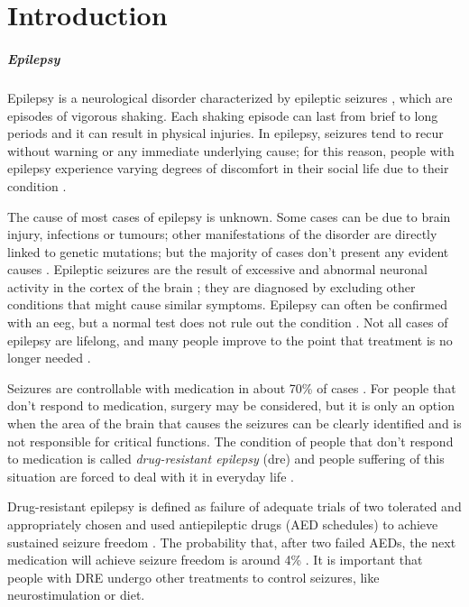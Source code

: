
\chapter{Introduction} \label{chap: introduction}

\paragraph{Epilepsy} Epilepsy is a neurological disorder characterized by epileptic seizures \cite{NEJM:epilepsy}\cite{Epilepsia:epilepsy}, which are episodes of vigorous shaking. Each shaking episode can last from brief to long periods and it can result in physical injuries. In epilepsy, seizures tend to recur without warning or any immediate underlying cause; for this reason, people with epilepsy experience varying degrees of discomfort in their social life due to their condition \cite{WHO:epilepsy}.

The cause of most cases of epilepsy is unknown. Some cases can be due to brain injury, infections or tumours; other manifestations of the disorder are directly linked to genetic mutations; but the majority of cases don't present any evident causes \cite{WHO:epilepsy}. Epileptic seizures are the result of excessive and abnormal neuronal activity in the cortex of the brain \cite{Epilepsia:epilepsy}; they are diagnosed by excluding other conditions that might cause similar symptoms. Epilepsy can often be confirmed with an \acf{eeg}, but a normal test does not rule out the condition \cite{Hpim:seizuresandepilepsy}. Not all cases of epilepsy are lifelong, and many people improve to the point that treatment is no longer needed \cite{WHO:epilepsy}.

Seizures are controllable with medication in about 70\% of cases \cite{ERN:treatmentofepilepsy}. For people that don't respond to medication, surgery may be considered, but it is only an option when the area of the brain that causes the seizures can be clearly identified and is not responsible for critical functions. The condition of people that don't respond to medication is called \textit{drug-resistant epilepsy} (\acs{dre}) and people suffering of this situation are forced to deal with it in everyday life \cite{Epilepsia:DRE}.

Drug-resistant epilepsy is defined as failure of adequate trials of two tolerated and appropriately chosen and used antiepileptic drugs (AED schedules) to achieve sustained seizure freedom \cite{Epilepsia:DRE}. The probability that, after two failed AEDs, the next medication will achieve seizure freedom is around 4\% \cite{NEJM:DRE}. It is important that people with DRE undergo other treatments to control seizures, like neurostimulation or diet.

